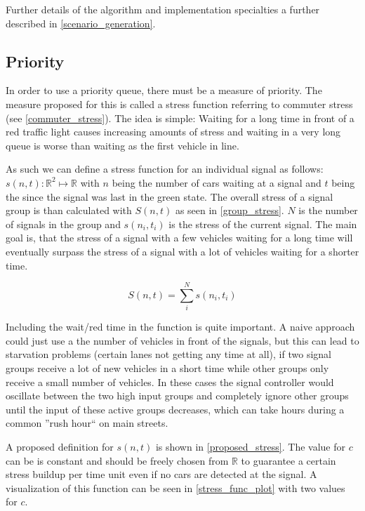 Further details of the algorithm and implementation specialties a further described in \autoref{scenario_generation}.

\subsection*{Priority}
\label{stress_prio}

In order to use a priority queue, there must be a measure of priority. The measure proposed for this is called a stress function referring to commuter stress (see \autoref{commuter_stress}). The idea is simple: Waiting for a long time in front of a red traffic light causes increasing amounts of stress and waiting in a very long queue is worse than waiting as the first vehicle in line.

As such we can define a stress function for an individual signal as follows: $s(n, t): \mathbb{R}^2 \mapsto \mathbb{R}$ with $n$ being the number of cars waiting at a signal and $t$ being the since the signal was last in the green state. The overall stress of a signal group is than calculated with $S(n, t)$ as seen in \autoref{group_stress}. $N$ is the number of signals in the group and $s\left(n_i, t_i\right)$ is the stress of the current signal. The main goal is, that the stress of a signal with a few vehicles waiting for a long time will eventually surpass the stress of a signal with a lot of vehicles waiting for a shorter time. 

\begin{equation}
	\label{group_stress}
	S(n, t) = \sum_{i}^{N}{s\left(n_i, t_i\right)}
\end{equation}

Including the wait/red time in the function is quite important. A naive approach could just use a the number of vehicles in front of the signals, but this can lead to starvation problems (certain lanes not getting any time at all), if two signal groups receive a lot of new vehicles in a short time while other groups only receive a small number of vehicles. In these cases the signal controller would oscillate between the two high input groups and completely ignore other groups until the input of these active groups decreases, which can take hours during a common ''rush hour`` on main streets.

A proposed definition for $s(n, t) $ is shown in \autoref{proposed_stress}. The value for $c$ can be is constant and should be freely chosen from $\mathbb{R}$ to guarantee a certain stress buildup per time unit even if no cars are detected at the signal. A visualization of this function can be seen in \autoref{stress_func_plot} with two values for $c$.

